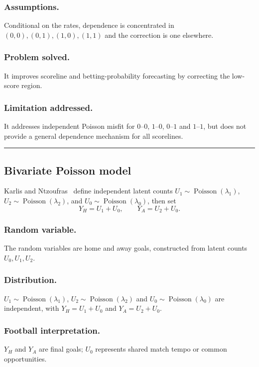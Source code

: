 \documentclass[11pt,a4paper]{amsart}
\numberwithin{equation}{section}
\begin{document}
\subsubsection*{Assumptions.} Conditional on the rates, dependence is concentrated in $(0,0),(0,1),(1,0),(1,1)$ and the correction is one elsewhere.
\subsubsection*{Problem solved.} It improves scoreline and betting-probability forecasting by correcting the low-score region.
\subsubsection*{Limitation addressed.} It addresses independent Poisson misfit for $0$--$0$, $1$--$0$, $0$--$1$ and $1$--$1$, but does not provide a general dependence mechanism for all scorelines.

\noindent\rule{\textwidth}{0.4pt}

\subsection{Bivariate Poisson model}
Karlis and Ntzoufras~\cite{karlis2003} define independent latent counts $U_1\sim\operatorname{Poisson}(\lambda_1)$, $U_2\sim\operatorname{Poisson}(\lambda_2)$, and $U_0\sim\operatorname{Poisson}(\lambda_0)$, then set
\begin{equation}Y_H=U_1+U_0,\qquad Y_A=U_2+U_0.\end{equation}

\subsubsection*{Random variable.} The random variables are home and away goals, constructed from latent counts $U_0,U_1,U_2$.
\subsubsection*{Distribution.} $U_1\sim\operatorname{Poisson}(\lambda_1)$, $U_2\sim\operatorname{Poisson}(\lambda_2)$ and $U_0\sim\operatorname{Poisson}(\lambda_0)$ are independent, with $Y_H=U_1+U_0$ and $Y_A=U_2+U_0$.
\subsubsection*{Football interpretation.} $Y_H$ and $Y_A$ are final goals; $U_0$ represents shared match tempo or common opportunities.
\end{document}
